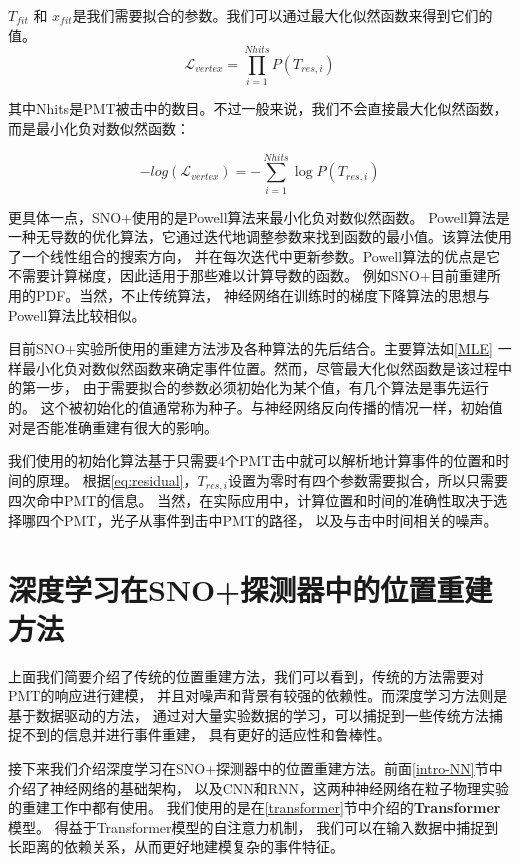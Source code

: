 $T_{fit}$ 和 $x_{fit}$是我们需要拟合的参数。我们可以通过最大化似然函数来得到它们的值。
\begin{equation}
\mathcal{L}_{vertex} = \prod_{i=1}^{Nhits} P(T_{res,i})
\end{equation}

其中Nhits是PMT被击中的数目。不过一般来说，我们不会直接最大化似然函数，而是最小化负对数似然函数：

\begin{equation}
-log(\mathcal{L}_{vertex}) = -\sum_{i=1}^{Nhits} \log P(T_{res,i})
\label{MLE}
\end{equation}

更具体一点，SNO+使用的是Powell算法\cite{powell1964efficient}来最小化负对数似然函数。
Powell算法是一种无导数的优化算法，它通过迭代地调整参数来找到函数的最小值。该算法使用了一个线性组合的搜索方向，
并在每次迭代中更新参数。Powell算法的优点是它不需要计算梯度，因此适用于那些难以计算导数的函数。
例如SNO+目前重建所用的PDF。当然，不止传统算法，
神经网络在训练时的梯度下降算法的思想与Powell算法比较相似。

目前SNO+实验所使用的重建方法涉及各种算法的先后结合。主要算法如\ref{MLE}
一样最小化负对数似然函数来确定事件位置。然而，尽管最大化似然函数是该过程中的第一步，
由于需要拟合的参数必须初始化为某个值，有几个算法是事先运行的。
这个被初始化的值通常称为种子。与神经网络反向传播的情况一样，初始值对是否能准确重建有很大的影响。

我们使用的初始化算法基于只需要4个PMT击中就可以解析地计算事件的位置和时间的原理。
根据\ref{eq:residual}，$T_{res,i}$设置为零时有四个参数需要拟合，所以只需要四次命中PMT的信息。
当然，在实际应用中，计算位置和时间的准确性取决于选择哪四个PMT，光子从事件到击中PMT的路径，
以及与击中时间相关的噪声。

\section{深度学习在SNO+探测器中的位置重建方法}\label{sec:dl_reconstruction}

上面我们简要介绍了传统的位置重建方法，我们可以看到，传统的方法需要对PMT的响应进行建模，
并且对噪声和背景有较强的依赖性。而深度学习方法则是基于数据驱动的方法，
通过对大量实验数据的学习，可以捕捉到一些传统方法捕捉不到的信息并进行事件重建，
具有更好的适应性和鲁棒性。

接下来我们介绍深度学习在SNO+探测器中的位置重建方法。前面\ref{intro-NN}节中介绍了神经网络的基础架构，
以及CNN和RNN，这两种神经网络在粒子物理实验的重建工作中都有使用。
我们使用的是在\ref{transformer}节中介绍的\textbf{Transformer}模型。
得益于Transformer模型的自注意力机制，
我们可以在输入数据中捕捉到长距离的依赖关系，从而更好地建模复杂的事件特征。

